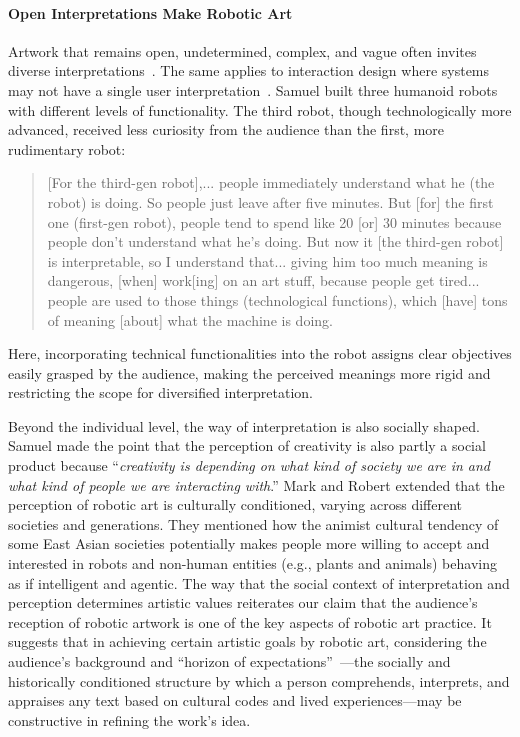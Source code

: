 \paragraph{Open Interpretations Make Robotic Art}
Artwork that remains open, undetermined, complex, and vague often invites diverse interpretations~\cite{eco1989open}. The same applies to interaction design where systems may not have a single user interpretation~\cite{sengers2006staying}. Samuel built three humanoid robots with different levels of functionality. The third robot, though technologically more advanced, received less curiosity from the audience than the first, more rudimentary robot:

\begin{quote}
    [For the third-gen robot],... people immediately understand what he (the robot) is doing. So people just leave after five minutes. But [for] the first one (first-gen robot), people tend to spend like 20 [or] 30 minutes because people don't understand what he's doing. But now it [the third-gen robot] is interpretable, so I understand that... giving him too much meaning is dangerous, [when] work[ing] on an art stuff, because people get tired... people are used to those things (technological functions), which [have] tons of meaning [about] what the machine is doing.
\end{quote}

Here, incorporating technical functionalities into the robot assigns clear objectives easily grasped by the audience, making the perceived meanings more rigid and restricting the scope for diversified interpretation.

Beyond the individual level, the way of interpretation is also socially shaped. Samuel made the point that the perception of creativity is also partly a social product because ``\textit{creativity is depending on what kind of society we are in and what kind of people we are interacting with}.'' Mark and Robert extended that the perception of robotic art is culturally conditioned, varying across different societies and generations. They mentioned how the animist cultural tendency of some East Asian societies potentially makes people more willing to accept and interested in robots and non-human entities (e.g., plants and animals) behaving as if intelligent and agentic. The way that the social context of interpretation and perception determines artistic values reiterates our claim that the audience's reception of robotic artwork is one of the key aspects of robotic art practice. It suggests that in achieving certain artistic goals by robotic art, considering the audience's background and ``horizon of expectations''~\cite{jauss1982toward}---the socially and historically conditioned structure by which a person comprehends, interprets, and appraises any text based on cultural codes and lived experiences---may be constructive in refining the work's idea.

